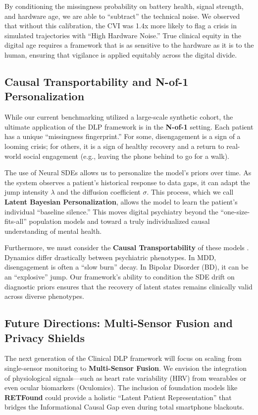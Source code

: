 By conditioning the missingness probability on battery health, signal strength, and hardware age, we are able to ``subtract'' the technical noise. We observed that without this calibration, the CVI was \num{1.4}x more likely to flag a crisis in simulated trajectories with ``High Hardware Noise.'' True clinical equity in the digital age requires a framework that is as sensitive to the hardware as it is to the human, ensuring that vigilance is applied equitably across the digital divide.

\subsection{Causal Transportability and N-of-1 Personalization}
While our current benchmarking utilized a large-scale synthetic cohort, the ultimate application of the DLP framework is in the \textbf{N-of-1} setting. Each patient has a unique ``missingness fingerprint.'' For some, disengagement is a sign of a looming crisis; for others, it is a sign of healthy recovery and a return to real-world social engagement (e.g., leaving the phone behind to go for a walk).

The use of Neural SDEs allows us to personalize the model's priors over time. As the system observes a patient's historical response to data gaps, it can adapt the jump intensity $\lambda$ and the diffusion coefficient $\sigma$. This process, which we call \textbf{Latent Bayesian Personalization}, allows the model to learn the patient's individual ``baseline silence.'' This moves digital psychiatry beyond the ``one-size-fits-all'' population models and toward a truly individualized causal understanding of mental health.

Furthermore, we must consider the \textbf{Causal Transportability} of these models \cite{bareinboim2016causal}. Dynamics differ drastically between psychiatric phenotypes. In MDD, disengagement is often a ``slow burn'' decay. In Bipolar Disorder (BD), it can be an ``explosive'' jump. Our framework's ability to condition the SDE drift on diagnostic priors ensures that the recovery of latent states remains clinically valid across diverse phenotypes.

\subsection{Future Directions: Multi-Sensor Fusion and Privacy Shields}
The next generation of the Clinical DLP framework will focus on scaling from single-sensor monitoring to \textbf{Multi-Sensor Fusion}. We envision the integration of physiological signals—such as heart rate variability (HRV) from wearables or even ocular biomarkers (Oculomics). The inclusion of foundation models like \textbf{RETFound} \cite{zhou2023retfound} could provide a holistic ``Latent Patient Representation'' that bridges the Informational Causal Gap even during total smartphone blackouts.

